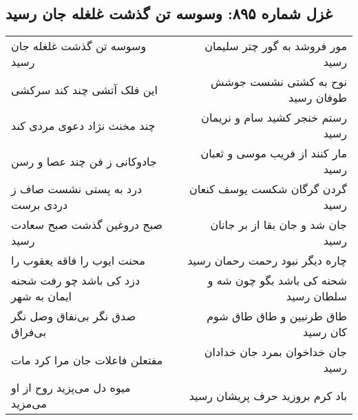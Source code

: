 \begin{center}
\section*{غزل شماره ۸۹۵: وسوسه تن گذشت غلغله جان رسید}
\label{sec:0895}
\begin{longtable}{l p{0.5cm} r}
وسوسه تن گذشت غلغله جان رسید
&&
مور فروشد به گور چتر سلیمان رسید
\\
این فلک آتشی چند کند سرکشی
&&
نوح به کشتی نشست جوشش طوفان رسید
\\
چند مخنث نژاد دعوی مردی کند
&&
رستم خنجر کشید سام و نریمان رسید
\\
جادوکانی ز فن چند عصا و رسن
&&
مار کنند از فریب موسی و ثعبان رسید
\\
درد به پستی نشست صاف ز دردی برست
&&
گردن گرگان شکست یوسف کنعان رسید
\\
صبح دروغین گذشت صبح سعادت رسید
&&
جان شد و جان بقا از بر جانان رسید
\\
محنت ایوب را فاقه یعقوب را
&&
چاره دیگر نبود رحمت رحمان رسید
\\
دزد کی باشد چو رفت شحنه ایمان به شهر
&&
شحنه کی باشد بگو چون شه و سلطان رسید
\\
صدق نگر بی‌نفاق وصل نگر بی‌فراق
&&
طاق طرنبین و طاق طاق شوم کان رسید
\\
مفتعلن فاعلات جان مرا کرد مات
&&
جان خداخوان بمرد جان خدادان رسید
\\
میوه دل می‌پزید روح از او می‌مزید
&&
باد کرم بروزید حرف پریشان رسید
\\
\end{longtable}
\end{center}
